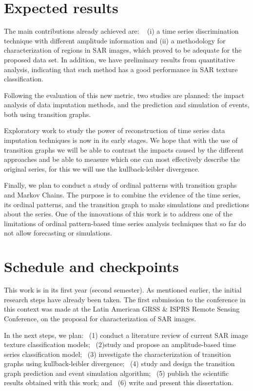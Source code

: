 \documentclass[paper=letter, fontsize=12pt]{article}
\begin{document}
\section{Expected results}\label{sec:results}

The main contributions already achieved are:
~ (i) a time series discrimination technique with different amplitude information and
(ii) a methodology for characterization of regions in SAR images, which proved to be adequate for the proposed data set.
In addition, we have preliminary results from quantitative analysis, indicating that such method has a good performance in SAR texture classification.

Following the evaluation of this new metric, two studies are planned: the impact analysis of data imputation methods, and the prediction and simulation of events, both using transition graphs.

Exploratory work to study the power of reconstruction of time series data imputation techniques is now in its early stages.
We hope that with the use of transition graphs we will be able to contrast the impacts caused by the different approaches and be able to measure which one can most effectively describe the original series, for this we will use the kullback-leibler divergence.

Finally, we plan to conduct a study of ordinal patterns with transition graphs and Markov Chains.
The purpose is to combine the evidence of the time series, its ordinal patterns, and the transition graph to make simulations and predictions about the series.
One of the innovations of this work is to address one of the limitations of ordinal pattern-based time series analysis techniques that so far do not allow forecasting or simulations.


\section{Schedule and checkpoints}\label{sec:checkpoint}

This work is in its first year (second semester). 
As mentioned earlier, the initial research steps have already been taken.
The first submission to the conference in this context was made at the Latin American GRSS \& ISPRS Remote Sensing Conference, on the proposal for characterization of SAR images.

In the next steps, we plan:
~(1) conduct a literature review of current SAR image texture classification models;
~(2)study and propose an amplitude-based time series classification model;
~(3) investigate the characterization of transition graphs using kullback-leibler divergence; 
~(4) study and design the transition graph prediction and event simulation algorithm; 
~(5) publish the scientific results obtained with this work; and
~(6) write and present this dissertation.
\end{document}
